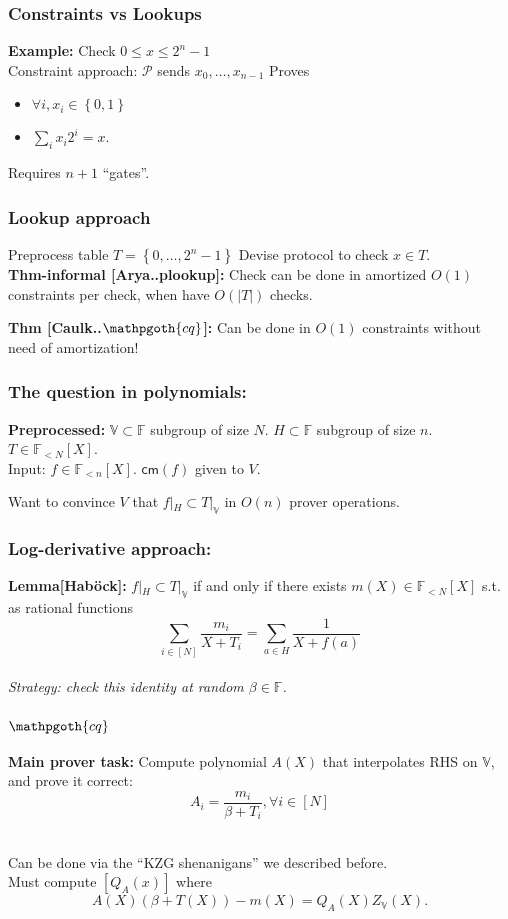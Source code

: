 \documentclass[shadesubsections,compress,14pt,mathserif]{beamer}
\newcommand{\F}{\ensuremath{{\mathbb F}}}
\newcommand{\set}[1]{\ensuremath{\left\{#1\right\}}}
\newcommand{\enc}[1]{\ensuremath{\left[#1\right ]}}
\newcommand{\kzg}[1]{\ensuremath{\enc{#1(x)}}}
\newcommand{\cm}{\ensuremath{\mathsf{cm}}}
\newcommand{\prv}{\ensuremath{\mathcal{P}}}
\newcommand{\polysofdeg}[1]{\F_{< #1}[X]}
\newcommand{\nl}{\\ \pause \vspace{0.2in}}
\newcommand{\cq}{\mathpgoth{cq} }
\newcommand{\bigspace}{\ensuremath{\mathbb{V}}}
\begin{document}
\begin{frame}
\frametitle{Constraints vs Lookups}
\textbf{Example:} Check $0\leq x \leq 2^n-1$\nl
Constraint approach:
$\prv$ sends $x_0,\ldots,x_{n-1}$
Proves
\begin{itemize}
 \item 
$\forall i, x_i\in \set{0,1}$
\item
$\sum_{i} x_i2^i =x$.\nl
\end{itemize}
Requires $n+1$ ``gates''.

\end{frame}
\begin{frame}
\frametitle{Lookup approach}
Preprocess table $T=\set{0,\ldots,2^n-1}$
Devise protocol to check $x\in T$.\nl
\textbf{Thm-informal [Arya..plookup]:} Check can be done in amortized $O(1)$ constraints 
per check, when have $O(|T|)$ checks.\nl

\textbf{Thm [Caulk..$\cq$]:} Can be done in $O(1)$ constraints without need of amortization!
\end{frame}
\begin{frame}
 \frametitle{The question in polynomials:}
 \textbf{Preprocessed:} $\bigspace\subset \F$ subgroup of size $N$. $H\subset \F$ subgroup of size $n$. $T\in \polysofdeg{N}$.\nl
 Input: $f\in \polysofdeg{n}$.  $\cm(f)$ given to $V$.\pause
 
\vspace{0.4in}
 Want to convince $V$ that $f|_H\subset T|_\bigspace$ in $O(n)$ prover operations.
 
\end{frame}
\begin{frame}
\frametitle{Log-derivative approach:}
\textbf{Lemma[Hab\"ock]:}
$f|_H\subset T|_\bigspace$ if and only if there exists $m(X)\in \polysofdeg{N}$ s.t.  as rational functions
\[\sum_{i\in [N]} \frac{m_i}{X+ T_i}=  \sum_{a\in H} \frac{1}{X+f(a)}   \]\nl
\textit{Strategy: check this identity at random $\beta \in \F$.}

\end{frame}
\begin{frame}
\frametitle{$\cq$}
\textbf{Main prover task:}
Compute polynomial $A(X)$ that interpolates RHS on $\bigspace$, and
prove it correct:
\[A_i=\frac{m_i}{\beta+T_i}, \forall i\in [N]\]\nl

Can be done via the ``KZG shenanigans'' we described before.\nl Must compute $\kzg{Q_A}$ where
\[A(X)(\beta+T(X))-m(X)=Q_A(X)Z_\bigspace(X).\]

\end{frame}
\end{document}
